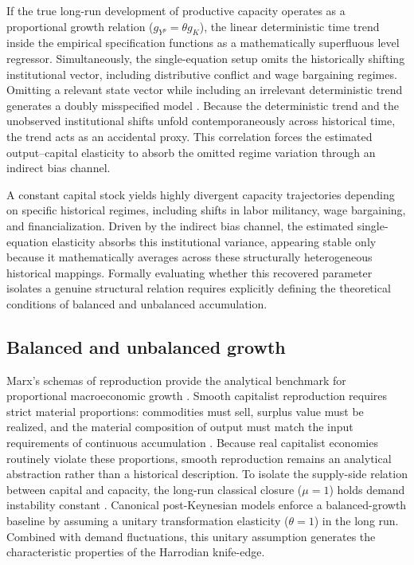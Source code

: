 \documentclass[11pt]{article}
\begin{document}
If the true long-run development of productive capacity operates as a proportional growth relation ($g_{Y^p} = \theta g_K$), the linear deterministic time trend inside the empirical specification functions as a mathematically superfluous level regressor. Simultaneously, the single-equation setup omits the historically shifting institutional vector, including distributive conflict and wage bargaining regimes. Omitting a relevant state vector while including an irrelevant deterministic trend generates a doubly misspecified model \citep{Basu2020}. Because the deterministic trend and the unobserved institutional shifts unfold contemporaneously across historical time, the trend acts as an accidental proxy. This correlation forces the estimated output--capital elasticity to absorb the omitted regime variation through an indirect bias channel.

A constant capital stock yields highly divergent capacity trajectories depending on specific historical regimes, including shifts in labor militancy, wage bargaining, and financialization. Driven by the indirect bias channel, the estimated single-equation elasticity absorbs this institutional variance, appearing stable only because it mathematically averages across these structurally heterogeneous historical mappings. Formally evaluating whether this recovered parameter isolates a genuine structural relation requires explicitly defining the theoretical conditions of balanced and unbalanced accumulation.

\subsection{Balanced and unbalanced growth}
\label{subsec:balanced_unbalanced_growth}

Marx's schemas of reproduction provide the analytical benchmark for proportional macroeconomic growth \citep{Okishio2022}. Smooth capitalist reproduction requires strict material proportions: commodities must sell, surplus value must be realized, and the material composition of output must match the input requirements of continuous accumulation \citep{Basu2022}. Because real capitalist economies routinely violate these proportions, smooth reproduction remains an analytical abstraction rather than a historical description. To isolate the supply-side relation between capital and capacity, the long-run classical closure ($\mu = 1$) holds demand instability constant \citep{Foley1985}. Canonical post-Keynesian models enforce a balanced-growth baseline by assuming a unitary transformation elasticity ($\theta = 1$) in the long run. Combined with demand fluctuations, this unitary assumption generates the characteristic properties of the Harrodian knife-edge.
\end{document}
